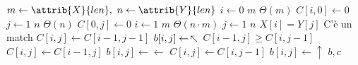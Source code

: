 \begin{codebox}
\li $m \gets \attrib{X}{len}, \ n \gets \attrib{Y}{len}$
\li \For $i \gets 0$ \To $m$ \Comment $\Theta(m)$
\li \Do $C[i,0] \gets 0$
    \End
\li \For $j \gets 1$ \To $n$ \Comment $\Theta(n)$
\li \Do $C[0,j] \gets 0$
    \End
\li \For $i \gets 1$ \To $m$ \Comment $\Theta(n\cdot m)$
\li \Do \For $j \gets 1$ \To $n$
\li     \Do \If $X[i] = Y[j]$ \Comment C'è un match
\li         \Then
                $C[i,j] \gets C[i-1,j-1]$
\li             $b[i,j] \gets \arrow{3}$
\li         \Else
\li             \If $C[i-1,j] \geq C[i,j-1]$
\li             \Then
                    $C[i,j] \gets C[i-1,j]$
\li                 $b[i,j] \gets \leftarrow$
\li             \Else
\li                 $C[i,j] \gets C[i,j-1]$
\li                 $b[i,j] \gets \uparrow$
                \End
            \End
        \End
    \End
\li \Return $b,c$
\end{codebox}